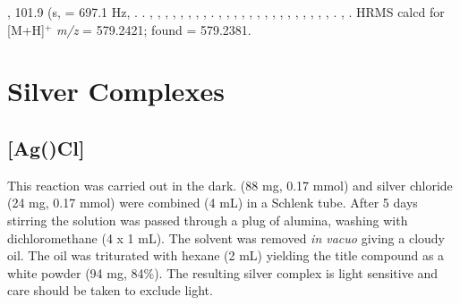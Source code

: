 ,
101.9 (s, \JPSe{} = 697.1 Hz, .
.
,
,
,
,
,
,
,
,
.
,
,
,
,
,
,
,
,
,
,
,
,
,
,
,
.
,
.
HRMS calcd for  [M+H]$^+$ \emph{m/z} = 579.2421; found = 579.2381.

\section{Silver Complexes}
\label{section:experimental:silver}



\subsection*{[Ag(\tButhixantphos)Cl]}


This reaction was carried out in the dark.  \tBuThixantphos{} (88 mg, 0.17 mmol) and silver chloride (24 mg, 0.17 mmol) were combined  (4 mL) in a Schlenk tube.  After 5 days stirring the solution was passed through a plug of alumina, washing with dichloromethane (4 x 1 mL).  The solvent was removed \emph{in vacuo} giving a cloudy oil.  The oil was triturated with hexane (2 mL) yielding the title compound as a white powder (94 mg, 84\%).  The resulting silver complex is light sensitive and care should be taken to exclude light.

